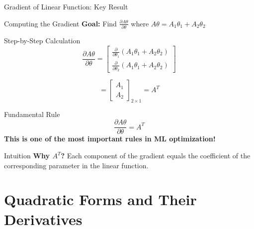 \documentclass{beamer}
\begin{document}
\begin{frame}{Gradient of Linear Function: Key Result}
\begin{keypointsbox}{Computing the Gradient}
\textbf{Goal:} Find $\frac{\partial A\theta}{\partial \theta}$ where $A\theta = A_{1}\theta_{1} + A_{2}\theta_{2}$
\end{keypointsbox}

\begin{examplebox}{Step-by-Step Calculation}
$$\frac{\partial A\theta}{\partial \theta} = \begin{bmatrix}
\frac{\partial}{\partial \theta_{1}}(A_{1}\theta_{1}+A_{2}\theta_{2}) \\
\frac{\partial}{\partial \theta_{2}}(A_{1}\theta_{1}+A_{2}\theta_{2})
\end{bmatrix}$$

$$= \begin{bmatrix}
A_{1} \\ A_{2}
\end{bmatrix}_{2 \times 1} = A^{T}$$
\end{examplebox}

\begin{alertbox}{Fundamental Rule}
$$\boxed{\frac{\partial A\theta}{\partial \theta} = A^{T}}$$
\textbf{This is one of the most important rules in ML optimization!}
\end{alertbox}

\begin{definitionbox}{Intuition}
\textbf{Why $A^T$?} Each component of the gradient equals the coefficient of the corresponding parameter in the linear function.
\end{definitionbox}
\end{frame}


\section{Quadratic Forms and Their Derivatives}
\end{document}

